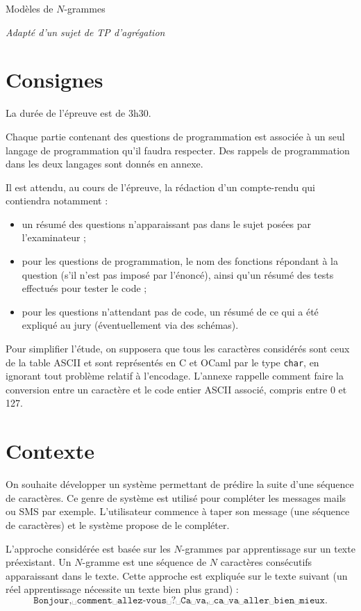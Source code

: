 \documentclass[10pt]{article}
\begin{document}
\begin{center}
\LARGE
Modèles de $N$-grammes
\normalsize
\end{center}
\textit{Adapté d'un sujet de TP d'agrégation}

\section*{Consignes}

La durée de l'épreuve est de 3h30.

Chaque partie contenant des questions de programmation est associée à un seul langage de programmation qu'il faudra respecter. Des rappels de programmation dans les deux langages sont donnés en annexe.

Il est attendu, au cours de l'épreuve, la rédaction d'un compte-rendu qui contiendra notamment :
\begin{itemize}
\item un résumé des questions n'apparaissant pas dans le sujet posées par l'examinateur ;
\item pour les questions de programmation, le nom des fonctions répondant à la question (s'il n'est pas imposé par l'énoncé), ainsi qu'un résumé des tests effectués pour tester le code ;
\item pour les questions n'attendant pas de code, un résumé de ce qui a été expliqué au jury (éventuellement via des schémas).
\end{itemize}

Pour simplifier l'étude, on supposera que tous les caractères considérés sont ceux de la table ASCII et sont représentés en C et OCaml par le type \verb"char", en ignorant tout problème relatif à l'encodage. L'annexe rappelle comment faire la conversion entre un caractère et le code entier ASCII associé, compris entre 0 et 127.

\section{Contexte}

On souhaite développer un système permettant de prédire la suite d'une séquence de caractères. Ce genre de système est utilisé pour compléter les messages mails ou SMS par exemple. L'utilisateur commence à taper son message (une séquence de caractères) et le système propose de le compléter.

L'approche considérée est basée sur les $N$-grammes par apprentissage sur un texte préexistant. Un $N$-gramme est une séquence de $N$ caractères consécutifs apparaissant dans le texte. Cette approche est expliquée sur le texte suivant (un réel apprentissage nécessite un texte bien plus grand) :
$$\texttt{Bonjour,␣comment␣allez-vous␣?␣Ca␣va,␣ca␣va␣aller␣bien␣mieux.}$$
\end{document}
